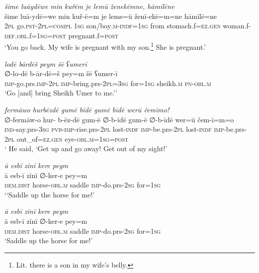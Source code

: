 \ea \label{BP.185}
\textit{šime luāydēwe min kuřēm je lemū ženekēmne, hāmīlēne} \\ 
\gll šime luā-ydē=we min kuř-ē=m je leme=ū ženī-ekē=m=ne hāmīlē=ne \\ 
 \textsc{2pl} go\textsc{.pst}-\textsc{2pl}\textsc{=compl} \textsc{1sg} son/boy\textsc{.m}\textsc{-indf}\textsc{=\textsc{1sg}} from stomach.f\textsc{=ez.gen} woman.f\textsc{-def}\textsc{.obl}.f\textsc{=\textsc{1sg}}\textsc{=\textsc{post}} pregnant.f\textsc{=\textsc{post}} \\ 
\glt `You go back. My wife is pregnant with my son.\footnote{Lit. there is a son in my wife’s belly.} She is pregnant.'
\z 
 
\ea \label{ŠJ.21}
\textit{lodē bārdēš peym šē ʕumerī} \\ 
\gll ∅-lo-dē b-ār-dē=š pey=m šē ʕumer-ī \\ 
 \textsc{imp-}go.prs.\textsc{imp-}\textsc{2pl} \textsc{imp-}bring.prs-\textsc{2pl}\textsc{=3sg} for\textsc{=\textsc{1sg}} sheikh\textsc{.m} \textsc{pn}\textsc{-obl}\textsc{.m} \\ 
\glt `Go [and] bring Sheikh Umer to me.’'
\z 
 
\ea \label{ŠJ.37}
\textit{fermāwo hurbēzdē gumē bīdē gumē bīdē werū čemīmo!} \\ 
\gll ∅-fermāw-o hur- b-ēz-dē gum-ē ∅-b-īdē gum-ē ∅-b-īdē wer=ū čem-ī=m=o \\ 
 \textsc{ind-}say.prs\textsc{-3sg} \textsc{pvb-}\textsc{imp-}rise.prs-\textsc{2pl} lost\textsc{-indf} \textsc{imp-}be.prs-\textsc{2pl} lost\textsc{-indf} \textsc{imp-}be.prs-\textsc{2pl} out\_of\textsc{=ez.gen} eye\textsc{-obl}\textsc{.m}\textsc{=\textsc{1sg}}\textsc{=\textsc{post}} \\ 
\glt ` He said, ‘Get up and go away! Get out of my sight!'
\z 
 
\ea \label{ŠJ.52}
\textit{ā esbī zīnī kere peym} \\ 
\gll ā esb-ī zīnī ∅-ker-e pey=m \\ 
 \textsc{dem.dist} horse\textsc{-obl}\textsc{.m} saddle \textsc{imp-}do.prs-\textsc{2sg} for\textsc{=\textsc{1sg}} \\ 
\glt `‘Saddle up the horse for me!'
\z 
 
\ea \label{ŠJ.53}
\textit{ā esbī zīnī kere peym} \\ 
\gll ā esb-ī zīnī ∅-ker-e pey=m \\ 
 \textsc{dem.dist} horse\textsc{-obl}\textsc{.m} saddle \textsc{imp-}do.prs-\textsc{2sg} for\textsc{=\textsc{1sg}} \\ 
\glt `Saddle up the horse for me!'
\z 
 
